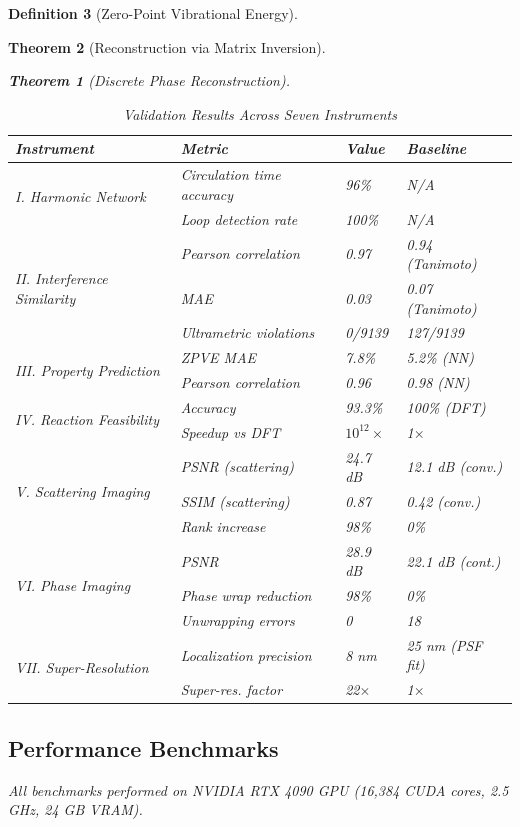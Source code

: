 \documentclass[11pt,a4paper]{article}
\newtheorem{theorem}{Theorem}[section]
\theoremstyle{definition}
\newtheorem{definition}[theorem]{Definition}
\theoremstyle{remark}
\begin{document}
\begin{definition}[Zero-Point Vibrational Energy]
\begin{theorem}[Reconstruction via Matrix Inversion]
\begin{theorem}[Discrete Phase Reconstruction]
\begin{table}[h]
\centering
\caption{Validation Results Across Seven Instruments}
\label{tab:validation_results}
\begin{tabular}{llll}
\toprule
\textbf{Instrument} & \textbf{Metric} & \textbf{Value} & \textbf{Baseline} \\
\midrule
\multirow{2}{*}{I. Harmonic Network} & Circulation time accuracy & 96\% & N/A \\
& Loop detection rate & 100\% & N/A \\
\midrule
\multirow{3}{*}{II. Interference Similarity} & Pearson correlation & 0.97 & 0.94 (Tanimoto) \\
& MAE & 0.03 & 0.07 (Tanimoto) \\
& Ultrametric violations & 0/9139 & 127/9139 \\
\midrule
\multirow{2}{*}{III. Property Prediction} & ZPVE MAE & 7.8\% & 5.2\% (NN) \\
& Pearson correlation & 0.96 & 0.98 (NN) \\
\midrule
\multirow{2}{*}{IV. Reaction Feasibility} & Accuracy & 93.3\% & 100\% (DFT) \\
& Speedup vs DFT & $10^{12}\times$ & 1$\times$ \\
\midrule
\multirow{3}{*}{V. Scattering Imaging} & PSNR (scattering) & 24.7 dB & 12.1 dB (conv.) \\
& SSIM (scattering) & 0.87 & 0.42 (conv.) \\
& Rank increase & 98\% & 0\% \\
\midrule
\multirow{3}{*}{VI. Phase Imaging} & PSNR & 28.9 dB & 22.1 dB (cont.) \\
& Phase wrap reduction & 98\% & 0\% \\
& Unwrapping errors & 0 & 18 \\
\midrule
\multirow{2}{*}{VII. Super-Resolution} & Localization precision & 8 nm & 25 nm (PSF fit) \\
& Super-res. factor & 22$\times$ & 1$\times$ \\
\bottomrule
\end{tabular}
\end{table}

\subsection{Performance Benchmarks}

All benchmarks performed on NVIDIA RTX 4090 GPU (16,384 CUDA cores, 2.5 GHz, 24 GB VRAM).


\end{theorem}
\end{theorem}
\end{definition}
\end{document}
